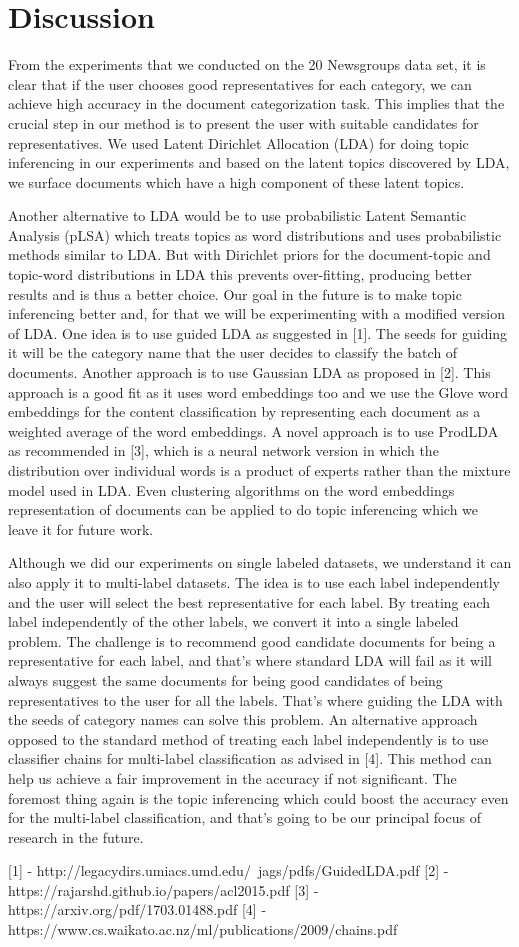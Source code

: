 \section{Discussion}
From the experiments that we conducted on the 20 Newsgroups data set, it is clear that if the user chooses good representatives for each category, we can achieve high accuracy in the document categorization task.  This implies that the crucial step in our method is to present the user with suitable candidates for representatives.  We used Latent Dirichlet Allocation (LDA) for doing topic inferencing in our experiments and based on the latent topics discovered by LDA, we surface documents which have a high component of these latent topics.

Another alternative to LDA would be to use probabilistic Latent Semantic Analysis (pLSA) which treats topics as word distributions and uses probabilistic methods similar to LDA.  But with Dirichlet priors for the document-topic and topic-word distributions in LDA this prevents over-fitting, producing better results and is thus a better choice. Our goal in the future is to make topic inferencing better and, for that we will be experimenting with a modified version of LDA.  One idea is to use guided LDA as suggested in [1].  The seeds for guiding it will be the category name that the user decides to classify the batch of documents.  Another approach is to use Gaussian LDA as proposed in [2].  This approach is a good fit as it uses word embeddings too and we use the Glove word embeddings for the content classification by representing each document as a weighted average of the word embeddings.  A novel approach is to use ProdLDA as recommended in [3], which is a neural network version in which the distribution over individual words is a product of experts rather than the mixture model used in LDA.  Even clustering algorithms on the word embeddings representation of documents can be applied to do topic inferencing which we leave it for future work.

Although we did our experiments on single labeled datasets, we understand it can also apply it to multi-label datasets.  The idea is to use each label independently and the user will select the best representative for each label.  By treating each label independently of the other labels, we convert it into a single labeled problem.  The challenge is to recommend good candidate documents for being a representative for each label, and that's where standard LDA will fail as it will always suggest the same documents for being good candidates of being representatives to the user for all the labels.  That's where guiding the LDA with the seeds of category names can solve this problem.  An alternative approach opposed to the standard method of treating each label independently is to use classifier chains for multi-label classification as advised in [4].  This method can help us achieve a fair improvement in the accuracy if not significant.  The foremost thing again is the topic inferencing which could boost the accuracy even for the multi-label classification, and that's going to be our principal focus of research in the future.

[1] - http://legacydirs.umiacs.umd.edu/~jags/pdfs/GuidedLDA.pdf
[2] - https://rajarshd.github.io/papers/acl2015.pdf
[3] - https://arxiv.org/pdf/1703.01488.pdf
[4] - https://www.cs.waikato.ac.nz/ml/publications/2009/chains.pdf
